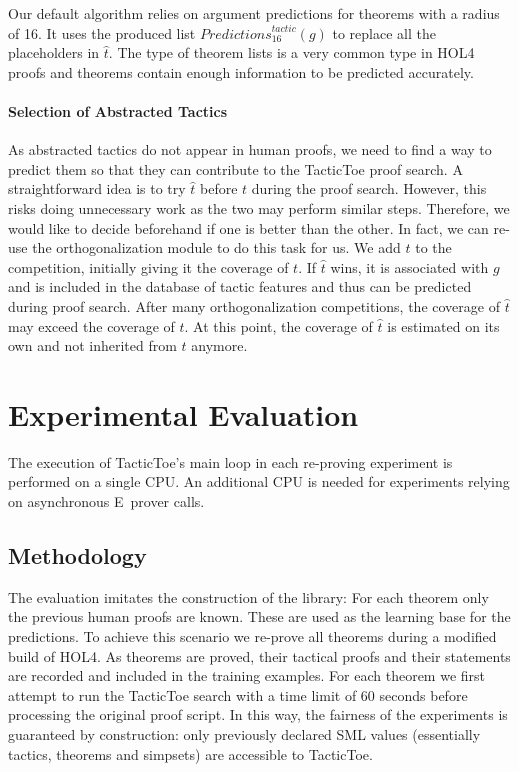 \documentclass[runningheads,a4paper,draft]{svjour3}
\def\holfour{\textsf{HOL4}\xspace}
\def\eprover{\textsf{E~prover}\xspace}
\def\sml{\textsf{SML}\xspace}
\def\tactictoe{\textsf{TacticToe}\xspace}
\begin{document}
Our default algorithm relies on argument predictions for theorems with a
radius of 16. It uses the produced list
$\mathit{Predictions}^{\mathit{tactic}}_{16}(g)$ to replace all the
placeholders
in $\hat{t}$.
The type of theorem lists is a very common type in \holfour proofs and theorems contain
enough information to be predicted accurately.


\paragraph{Selection of Abstracted Tactics}
As abstracted tactics do not appear in human proofs, we need to find a way to
predict them so that they can contribute to the \tactictoe proof search.
A straightforward idea is to try $\hat{t}$ before $t$ during the proof search.
However, this risks doing unnecessary work as the two may perform similar steps.
Therefore, we would like to decide
beforehand if one is better than the other.
In fact, we can re-use the orthogonalization module to do this task for us.
We add $\hat{t}$ to the competition, initially giving it the coverage of $t$.
If $\hat{t}$
wins, it is associated with $g$ and is included in the database of tactic
features and thus can be predicted during proof search.
After many orthogonalization competitions, the coverage of $\hat{t}$ may exceed
the coverage of
$t$. At
this point, the coverage of $\hat{t}$ is estimated on its own and not inherited
from
$t$ anymore.




\section{Experimental Evaluation}\label{s:experiments}
The execution of \tactictoe's main loop in each re-proving experiment is
performed on a single CPU. An additional CPU is needed for experiments relying
on asynchronous \eprover calls.


\subsection{Methodology}
The evaluation imitates the construction of the library: For each theorem only
the previous human proofs are known. These are used as the learning base for
the predictions.
To achieve this scenario we re-prove all theorems during a modified build of
\holfour.
As theorems are proved, their tactical proofs and their statements are
recorded and included in the training examples.
For each theorem we first attempt to run the \tactictoe search with a time
limit of 60 seconds before processing the original proof script.
In this way, the fairness of the experiments is guaranteed by construction:
only previously declared \sml values (essentially tactics, theorems and
simpsets) are accessible to \tactictoe.
\end{document}
